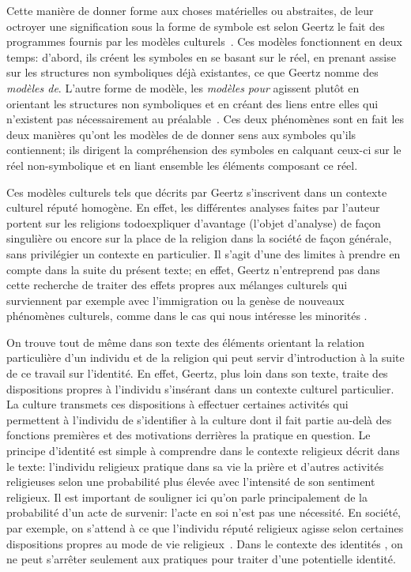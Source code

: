 Cette manière de donner forme aux choses matérielles ou abstraites, de leur octroyer une signification sous la forme de symbole est selon Geertz le fait des programmes fournis par les modèles culturels~\citep[25]{Geertz1972}. 
Ces modèles fonctionnent en deux temps: d'abord, ils créent les symboles en se basant sur le réel, en prenant assise sur les structures non symboliques déjà existantes, ce que Geertz nomme des \emph{modèles de}. 
L'autre forme de modèle, les \emph{modèles pour} agissent plutôt en orientant les structures non symboliques et en créant des liens entre elles qui n'existent pas nécessairement au préalable~\citep[26--27]{Geertz1972}. 
Ces deux phénomènes sont en fait les deux manières qu'ont les modèles de de donner sens aux symboles qu'ils contiennent; ils dirigent la compréhension des symboles en calquant ceux-ci sur le réel non-symbolique et en liant ensemble les éléments composant ce réel.

Ces modèles culturels  tels que décrits par Geertz s'inscrivent dans un contexte culturel réputé homogène. 
En effet, les différentes analyses faites par l'auteur portent sur les religions todo{expliquer d'avantage} (l'objet d'analyse) de façon singulière ou encore sur la place de la religion dans la société de façon générale, sans privilégier un contexte en particulier. 
Il s'agit d'une des limites à prendre en compte dans la suite du présent texte; en effet, Geertz n'entreprend pas dans cette recherche de traiter des effets propres aux mélanges culturels qui surviennent par exemple avec l'immigration ou la genèse de nouveaux phénomènes culturels, comme dans le cas qui nous intéresse les minorités \lgbt{}.

On trouve tout de même dans son texte des éléments orientant la relation particulière d'un individu et de la religion qui peut servir d'introduction à la suite de ce travail sur l'identité. 
En effet, Geertz, plus loin dans son texte, traite des dispositions propres à l'individu s'insérant dans un contexte culturel particulier. 
La culture transmets ces dispositions à effectuer certaines activités qui permettent à l'individu de s'identifier à la culture dont il fait partie au-delà des fonctions premières et des motivations derrières la pratique en question. 
Le principe d'identité est simple à comprendre dans le contexte religieux décrit dans le texte: l'individu religieux pratique dans sa vie la prière et d'autres activités religieuses selon une probabilité plus élevée avec l'intensité de son sentiment religieux. 
Il est important de souligner ici qu'on parle principalement de la probabilité d'un acte de survenir: l'acte en soi n'est pas une nécessité. 
En société, par exemple, on s'attend à ce que l'individu réputé religieux agisse selon certaines dispositions propres au mode de vie religieux~\citep[28--30]{Geertz1972}. 
Dans le contexte des identités \lgbt{}, on ne peut s'arrêter seulement aux pratiques pour traiter d'une potentielle identité.

